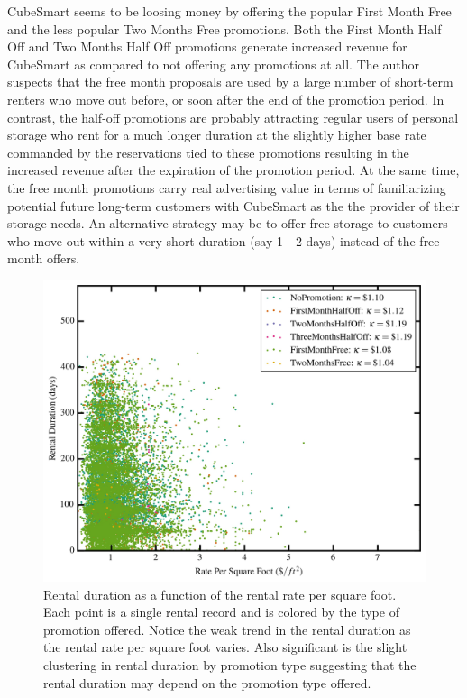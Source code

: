 \documentclass[times]{aastex6}
\begin{document}
CubeSmart seems to be loosing money by offering the popular First Month Free and the less popular Two Months Free promotions. Both the First Month Half Off and Two Months Half Off promotions generate increased revenue for CubeSmart as compared to not offering any promotions at all. The author suspects that the free month proposals are used by a large number of short-term renters who move out before, or soon after the end of the promotion period. In contrast, the half-off promotions are probably attracting regular users of personal storage who rent for a much longer duration at the slightly higher base rate commanded by the reservations tied to these promotions resulting in the increased revenue after the expiration of the promotion period. At the same time, the free month promotions carry real advertising value in terms of familiarizing potential future long-term customers with CubeSmart as the the provider of their storage needs. An alternative strategy may be to offer free storage to customers who move out within a very short duration (say 1 - 2 days) instead of the free month offers.

\begin{figure}
	\includegraphics[width=0.9\columnwidth]{plots/FootRateVSDurations.jpg}
    \caption{Rental duration as a function of the rental rate per square foot. Each point is a single rental record and is colored by the type of promotion offered. Notice the weak trend in the rental duration as the rental rate per square foot varies. Also significant is the slight clustering in rental duration by promotion type suggesting that the rental duration may depend on the promotion type offered.}
    \label{fig:FootRateVSDuration}
\end{figure}
\end{document}
